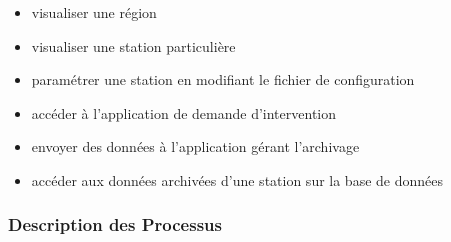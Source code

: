 \begin{itemize}
\item   visualiser une région \\
\item	visualiser une station particulière \\
\item	paramétrer une station en modifiant le fichier de configuration \\
\item	accéder à l'application de demande d'intervention \\
\item	envoyer des données à l'application gérant l'archivage\\ 
\item	accéder aux données archivées d'une station sur la base de données\\
\end{itemize}


\subsubsection{Description des Processus}

